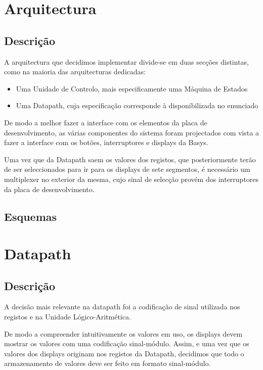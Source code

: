 \documentclass[a4paper]{article}
\begin{document}


\tableofcontents
\pagebreak

\section{Arquitectura}
\subsection{Descrição}
A arquitectura que decidimos implementar divide-se em duas secções distintas, como na maioria das arquitecturas dedicadas:
\begin{itemize}
\item Uma Unidade de Controlo, mais especificamente uma Máquina de Estados
\item Uma Datapath, cuja especificação corresponde à disponibilizada no enunciado
\end{itemize}

De modo a melhor fazer a interface com os elementos da placa de desenvolvimento, as várias componentes do sistema foram projectados com vista a fazer a interface com os botões, interruptores e displays da Basys.

Uma vez que da Datapath saem os valores dos registos, que posteriormente terão de ser seleccionados para ir para os displays de sete segmentos, é necessário um multiplexer no exterior da mesma, cujo sinal de selecção provém dos interruptores da placa de desenvolvimento.

\pagebreak
\subsection{Esquemas}
\pagebreak

\section{Datapath}
\subsection{Descrição}
A decisão mais relevante na datapath foi a codificação de sinal utilizada nos registos e na Unidade Lógico-Aritmética.

De modo a compreender intuitivamente os valores em uso, os displays devem mostrar os valores com uma codificação sinal-módulo. Assim, e uma vez que os valores dos displays originam nos registos da Datapath, decidimos que todo o armazenamento de valores deve ser feito em formato sinal-módulo.
\end{document}
